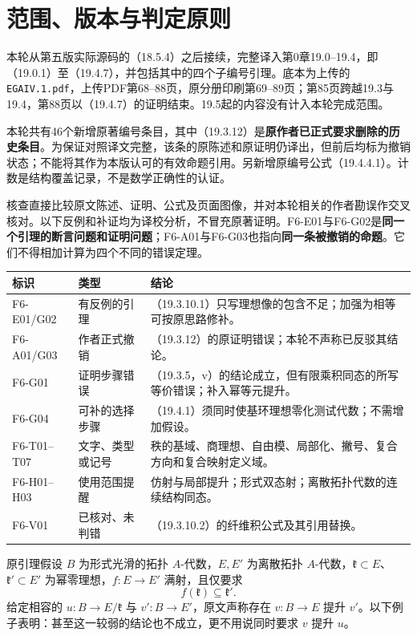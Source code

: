\section*{范围、版本与判定原则}
本轮从第五版实际源码的（18.5.4）之后接续，完整译入第0章19.0--19.4，即（19.0.1）至（19.4.7），并包括其中的四个子编号引理。底本为上传的\texttt{EGAIV.1.pdf}，上传PDF第68--88页，原分册印刷第69--89页；第85页跨越19.3与19.4，第88页以（19.4.7）的证明结束。19.5起的内容没有计入本轮完成范围。

本轮共有46个新增原著编号条目，其中（19.3.12）是\textbf{原作者已正式要求删除的历史条目}。为保证对照译文完整，该条的原陈述和原证明仍译出，但前后均标为撤销状态；不能将其作为本版认可的有效命题引用。另新增原编号公式（19.4.4.1）。计数是结构覆盖记录，不是数学正确性的认证。

核查直接比较原文陈述、证明、公式及页面图像，并对本轮相关的作者勘误作交叉核对。以下反例和补证均为译校分析，不冒充原著证明。F6-E01与F6-G02是\textbf{同一个引理的断言问题和证明问题}；F6-A01与F6-G03也指向\textbf{同一条被撤销的命题}。它们不得相加计算为四个不同的错误定理。

\begin{longtable}{@{}p{.17\linewidth}p{.19\linewidth}p{.55\linewidth}@{}}
\toprule 标识 & 类型 & 结论\\ \midrule\endhead
F6-E01/G02 & 有反例的引理 & （19.3.10.1）只写理想像的包含不足；加强为相等可按原思路修补。\\
F6-A01/G03 & 作者正式撤销 & （19.3.12）的原证明错误；本轮不声称已反驳其结论。\\
F6-G01 & 证明步骤错误 & （19.3.5，v）的结论成立，但有限乘积同态的所写等价错误；补入幂等元提升。\\
F6-G04 & 可补的选择步骤 & （19.4.1）须同时使基环理想零化测试代数；不需增加假设。\\
F6-T01--T07 & 文字、类型或记号 & 秩的基域、商理想、自由模、局部化、撇号、复合方向和复合映射定义域。\\
F6-H01--H03 & 使用范围提醒 & 仿射与局部提升；形式双态射；离散拓扑代数的连续结构同态。\\
F6-V01 & 已核对、未判错 & （19.3.10.2）的纤维积公式及其引用替换。\\
\bottomrule
\end{longtable}

原引理假设 $B$ 为形式光滑的拓扑 $A$-代数，$E,E'$ 为离散拓扑 $A$-代数，$\mathfrak k\subset E$、$\mathfrak k'\subset E'$ 为幂零理想，$f:E\to E'$ 满射，且仅要求
\[
 f(\mathfrak k)\subseteq\mathfrak k'.
\]
给定相容的 $u:B\to E/\mathfrak k$ 与 $v':B\to E'$，原文声称存在 $v:B\to E$ 提升 $v'$。以下例子表明：甚至这一较弱的结论也不成立，更不用说同时要求 $v$ 提升 $u$。

